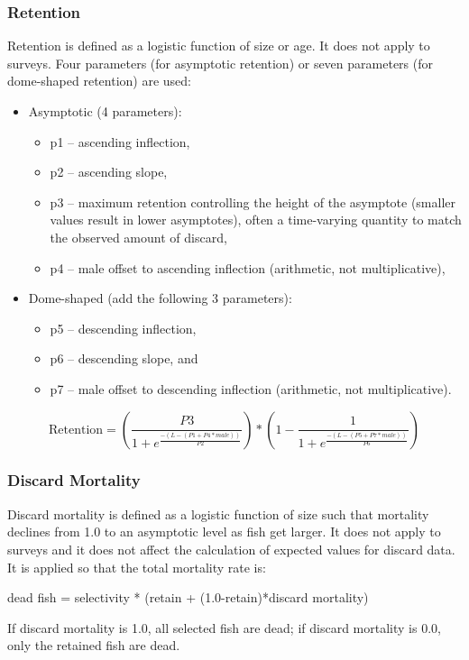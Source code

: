 \subsubsection{Retention}
Retention is defined as a logistic function of size or age.  It does not apply to surveys.  Four parameters (for asymptotic retention) or seven parameters (for dome-shaped retention) are used:
\begin{itemize}
	\item Asymptotic (4 parameters):
	\begin{itemize}
		\item p1 – ascending inflection,
		\item p2 – ascending slope,
		\item p3 – maximum retention controlling the height of the asymptote (smaller values result in lower asymptotes), often a time-varying quantity to match the observed amount of discard,
		\item p4 – male offset to ascending inflection (arithmetic, not multiplicative),
	\end{itemize}
	\item Dome-shaped (add the following 3 parameters):
	\begin{itemize}
		\item p5 – descending inflection,
		\item p6 – descending slope, and
		\item p7 – male offset to descending inflection (arithmetic, not multiplicative).
	\end{itemize}
\end{itemize}

\begin{equation}
	\text{Retention} = \left(\frac{P3}{1 + e^{\frac{-(L-(P1+P4*male))}{P2}}}\right)*\left(1 - \frac{1}{1 + e^{\frac{-(L-(P5+P7*male))}{P6}}}\right)
\end{equation}

\subsubsection{Discard Mortality}
Discard mortality is defined as a logistic function of size such that mortality declines from 1.0 to an asymptotic level as fish get larger.  It does not apply to surveys and it does not affect the calculation of expected values for discard data.   It is applied so that the total mortality rate is:
\begin{center}
	dead fish = selectivity * (retain + (1.0-retain)*discard mortality)
\end{center}
If discard mortality is 1.0, all selected fish are dead; if discard mortality is 0.0, only the retained fish are dead.


